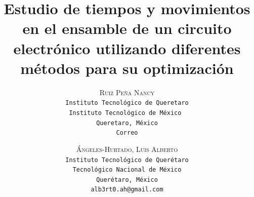    \lfoot{ \thepage}
    
    \setlength{\droptitle}{-5\baselineskip} %
    \title{\textbf{Estudio de tiempos y movimientos en el ensamble de un circuito electrónico utilizando diferentes métodos para su optimización }} %
    
     \author{ 
     \textsc{Ruiz Peña Nancy}\\ 
     \texttt{ Instituto Tecnológico de Queretaro  } \\ 
     \texttt{Instituto Tecnológico de México } \\ 
     \texttt{Queretaro, México}\\ 
     \texttt{Correo} 
     \and 
     \textsc{Ángeles-Hurtado, Luis Alberto}\\ 
     \texttt{ Instituto Tecnológico de Querétaro } \\ 
     \texttt{ Tecnológico Nacional de México } \\ 
     \texttt{Querétaro, México}\\ 
     \texttt{alb3rt0.ah@gmail.com} 
    }
    
    
    
    
    \maketitle
    \thispagestyle{fancy}
    
